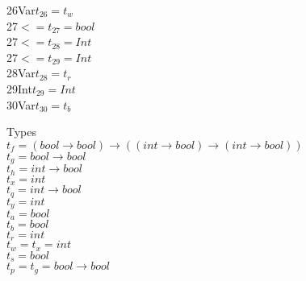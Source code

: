 \documentclass{article}
\begin{document}
\begin{multicols}{3}
26\hspace{1cm}Var\hspace{1.2cm}$t_{26} = t_w$\\
27\hspace{1cm}$<=$\hspace{1.2cm}$t_{27} = bool$\\
27\hspace{1cm}$<=$\hspace{1.2cm}$t_{28} = Int$\\
27\hspace{1cm}$<=$\hspace{1.2cm}$t_{29} = Int$\\
28\hspace{1cm}Var\hspace{1.2cm}$t_{28} = t_r$\\
29\hspace{1cm}Int\hspace{1.3cm}$t_{29} = Int$\\
30\hspace{1cm}Var\hspace{1.2cm}$t_{30} = t_b$\\
\columnbreak

\noindent
Types\\
$t_f=(bool\rightarrow bool)\rightarrow ((int \rightarrow bool) \rightarrow (int \rightarrow bool))$\\
$t_g=bool \rightarrow bool$\\
$t_h=int \rightarrow bool$\\
$t_x=int$\\
$t_q=int \rightarrow bool$\\
$t_y=int$\\
$t_a=bool$\\
$t_b=bool$\\
$t_r=int$\\
$t_w=t_x=int$\\
$t_s=bool$\\
$t_p=t_g=bool \rightarrow bool$\\
\end{multicols}
\end{document}
